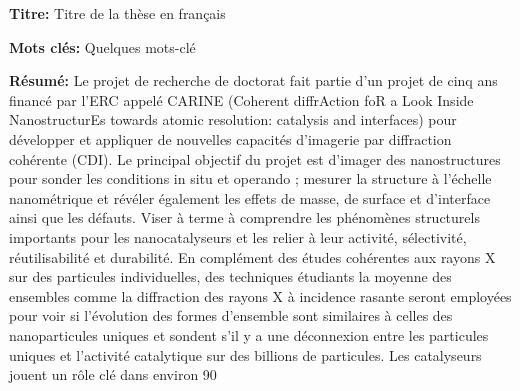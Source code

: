 \documentclass[french,12pt,a4paper]{book}
\begin{document}
\small

\begin{mdframed}[linecolor=Prune,linewidth=1]

\textbf{Titre:} Titre de la thèse en français


\noindent \textbf{Mots clés:} Quelques mots-clé

\vspace{-.5cm}
\begin{multicols}{2}
\noindent \textbf{Résumé:} Le projet de recherche de doctorat fait partie d'un projet de cinq ans financé par l'ERC appelé CARINE (Coherent diffrAction foR a Look Inside NanostructurEs towards atomic resolution: catalysis and interfaces) pour développer et appliquer de nouvelles capacités d'imagerie par diffraction cohérente (CDI). Le principal objectif du projet est d'imager des nanostructures pour sonder les conditions in situ et operando ; mesurer la structure à l'échelle nanométrique et révéler également les effets de masse, de surface et d'interface ainsi que les défauts. Viser à terme à comprendre les phénomènes structurels importants pour les nanocatalyseurs et les relier à leur activité, sélectivité, réutilisabilité et durabilité. En complément des études cohérentes aux rayons X sur des particules individuelles, des techniques étudiants la moyenne des ensembles comme la diffraction des rayons X à incidence rasante seront employées pour voir si l'évolution des formes d'ensemble sont similaires à celles des nanoparticules uniques et sondent s'il y a une déconnexion entre les particules uniques et l'activité catalytique sur des billions de particules. Les catalyseurs jouent un rôle clé dans environ 90%
\end{multicols}

\end{mdframed}
\end{document}
